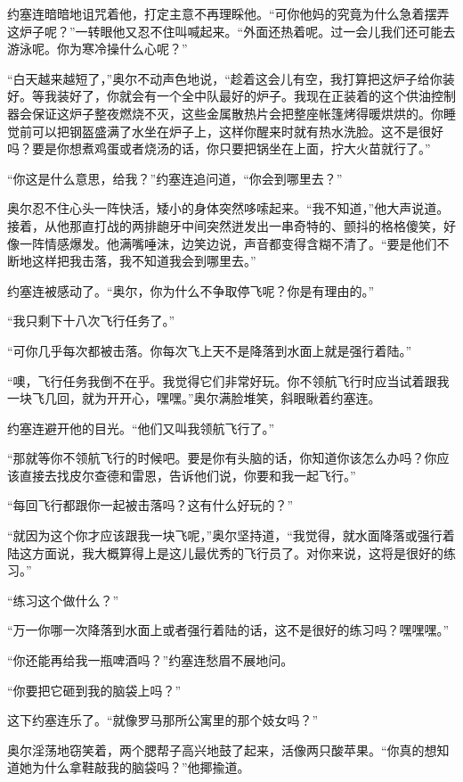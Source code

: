     约塞连暗暗地诅咒着他，打定主意不再理睬他。“可你他妈的究竟为什么急着摆弄这炉子呢？”一转眼他又忍不住叫喊起来。“外面还热着呢。过一会儿我们还可能去游泳呢。你为寒冷操什么心呢？”

    “白天越来越短了，”奥尔不动声色地说，“趁着这会儿有空，我打算把这炉子给你装好。等我装好了，你就会有一个全中队最好的炉子。我现在正装着的这个供油控制器会保证这炉子整夜燃烧不灭，这些金属散热片会把整座帐篷烤得暖烘烘的。你睡觉前可以把钢盔盛满了水坐在炉子上，这样你醒来时就有热水洗脸。这不是很好吗？要是你想煮鸡蛋或者烧汤的话，你只要把锅坐在上面，拧大火苗就行了。”

    “你这是什么意思，给我？”约塞连追问道，“你会到哪里去？”

    奥尔忍不住心头一阵快活，矮小的身体突然哆嗦起来。“我不知道，”他大声说道。接着，从他那直打战的两排龅牙中间突然迸发出一串奇特的、颤抖的格格傻笑，好像一阵情感爆发。他满嘴唾沫，边笑边说，声音都变得含糊不清了。“要是他们不断地这样把我击落，我不知道我会到哪里去。”

    约塞连被感动了。“奥尔，你为什么不争取停飞呢？你是有理由的。”

    “我只剩下十八次飞行任务了。”

    “可你几乎每次都被击落。你每次飞上天不是降落到水面上就是强行着陆。”

    “噢，飞行任务我倒不在乎。我觉得它们非常好玩。你不领航飞行时应当试着跟我一块飞几回，就为开开心，嘿嘿。”奥尔满脸堆笑，斜眼瞅着约塞连。

    约塞连避开他的目光。“他们又叫我领航飞行了。”

    “那就等你不领航飞行的时候吧。要是你有头脑的话，你知道你该怎么办吗？你应该直接去找皮尔查德和雷恩，告诉他们说，你要和我一起飞行。”

    “每回飞行都跟你一起被击落吗？这有什么好玩的？”

    “就因为这个你才应该跟我一块飞呢，”奥尔坚持道，“我觉得，就水面降落或强行着陆这方面说，我大概算得上是这儿最优秀的飞行员了。对你来说，这将是很好的练习。”

    “练习这个做什么？”

    “万一你哪一次降落到水面上或者强行着陆的话，这不是很好的练习吗？嘿嘿嘿。”

    “你还能再给我一瓶啤酒吗？”约塞连愁眉不展地问。

    “你要把它砸到我的脑袋上吗？”

    这下约塞连乐了。“就像罗马那所公寓里的那个妓女吗？”

    奥尔淫荡地窃笑着，两个腮帮子高兴地鼓了起来，活像两只酸苹果。“你真的想知道她为什么拿鞋敲我的脑袋吗？”他揶揄道。


